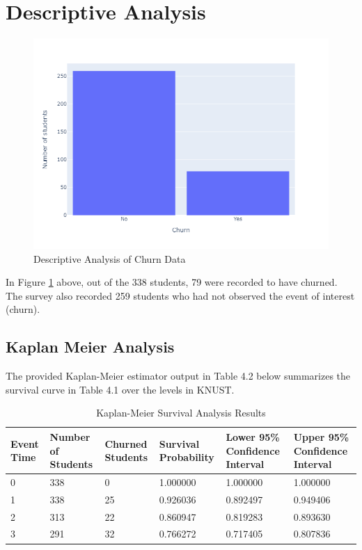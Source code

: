 \documentclass[doublespacing,12pt]{report}
\begin{document}
\section{Descriptive Analysis}
\begin{figure}[H]
    \centering
    \includegraphics[width=1\linewidth, height=0.5\textheight]{Figure 4/distribution.png}
    \caption{Descriptive Analysis of Churn Data}
    \label{fig: Descriptive Analysis}
\end{figure}
In Figure \ref{fig: Descriptive Analysis} above, out of the 338 students, 79 were recorded to have churned. The survey also recorded 259 students who had not observed the event of interest (churn).






\subsection{Kaplan Meier Analysis}

The provided Kaplan-Meier estimator output in Table 4.2 below summarizes the survival curve in Table 4.1 over the levels in KNUST.


\begin{table}[H]
\centering
\begin{tabularx}{\textwidth}{lXXXXX}
\toprule
Event Time & Number of Students & Churned Students & Survival Probability & Lower 95\% Confidence Interval & Upper 95\% Confidence Interval \\
\midrule
0 & 338 & 0 & 1.000000 & 1.000000 & 1.000000 \\
1 & 338 & 25 & 0.926036 & 0.892497 & 0.949406 \\
2 & 313 & 22 & 0.860947 & 0.819283 & 0.893630 \\
3 & 291 & 32 & 0.766272 & 0.717405 & 0.807836 \\ 
\bottomrule
\end{tabularx}
\caption{Kaplan-Meier Survival Analysis Results}
\label{tab:km_results}
\end{table}
\end{document}
